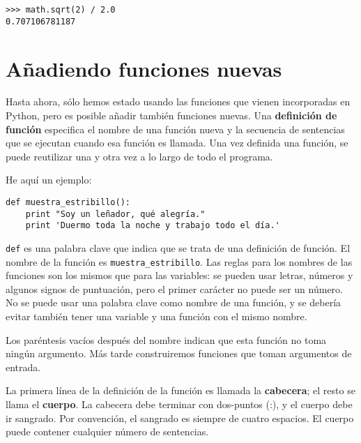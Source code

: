 
\beforeverb
\begin{verbatim}
>>> math.sqrt(2) / 2.0
0.707106781187
\end{verbatim}
\afterverb
%


\section{Añadiendo funciones nuevas}

Hasta ahora, sólo hemos estado usando las funciones que vienen incorporadas en Python,
pero es posible añadir también funciones nuevas.
Una {\bf definición de función} especifica el nombre de una función nueva y
la secuencia de sentencias que se ejecutan cuando esa función es llamada.
Una vez definida una función, se puede reutilizar una y otra vez
a lo largo de todo el programa.


He aquí un ejemplo:

\beforeverb
\begin{verbatim}
def muestra_estribillo():
    print "Soy un leñador, qué alegría."
    print 'Duermo toda la noche y trabajo todo el día.'
\end{verbatim}
\afterverb
%
{\tt def} es una palabra clave que indica que se trata de una definición
de función. El nombre de la función es \verb"muestra_estribillo". Las
reglas para los nombres de las funciones son los mismos que para las variables:
se pueden usar letras, números y algunos signos de puntuación, pero el primer carácter
no puede ser un número. No se puede usar una palabra clave como nombre de una función,
y se debería evitar también tener una variable y una función con el mismo
nombre.


Los paréntesis vacíos después del nombre indican que esta función
no toma ningún argumento. Más tarde construiremos funciones que
toman argumentos de entrada.


La primera línea de la definición de la función es llamada la {\bf cabecera};
el resto se llama el {\bf cuerpo}. La cabecera debe terminar con dos-puntos (:),
y el cuerpo debe ir sangrado. Por convención, el sangrado es
siempre de cuatro espacios. El cuerpo puede contener
cualquier número de sentencias.

